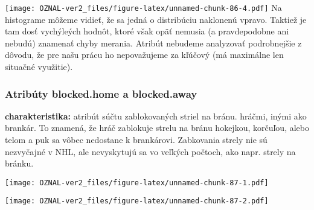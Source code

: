 \documentclass[
]{article}
\newenvironment{Shaded}{\begin{snugshade}}{\end{snugshade}}
\newcommand{\AttributeTok}[1]{\textcolor[rgb]{0.77,0.63,0.00}{#1}}
\newcommand{\FunctionTok}[1]{\textcolor[rgb]{0.00,0.00,0.00}{#1}}
\newcommand{\NormalTok}[1]{#1}
\newcommand{\SpecialCharTok}[1]{\textcolor[rgb]{0.00,0.00,0.00}{#1}}
\newcommand{\StringTok}[1]{\textcolor[rgb]{0.31,0.60,0.02}{#1}}
\begin{document}
\texttt{[image: OZNAL-ver2\_files/figure-latex/unnamed-chunk-86-4.pdf]}
Na histograme môžeme vidieť, že sa jedná o distribúciu naklonenú vpravo.
Taktiež je tam dosť vychýleých hodnôt, ktoré však opäť nemusia (a
pravdepodobne ani nebudú) znamenať chyby merania. Atribút nebudeme
analyzovať podrobnejšie z dôvodu, že pre našu prácu ho nepovažujeme za
kľúčový (má maximálne len situačné využitie).

\hypertarget{atribuxfaty-blocked.home-a-blocked.away}{%
\subsubsection{Atribúty blocked.home a
blocked.away}\label{atribuxfaty-blocked.home-a-blocked.away}}

\textbf{charakteristika:} atribút súčtu zablokovaných striel na bránu.
hráčmi, inými ako brankár. To znamená, že hráč zablokuje strelu na bránu
hokejkou, korčuľou, alebo telom a puk sa vôbec nedostane k brankárovi.
Zabkovania strely nie sú nezvyčajné v NHL, ale nevyskytujú sa vo veľkých
počtoch, ako napr. strely na bránku.

\begin{Shaded}
\end{Shaded}

\texttt{[image: OZNAL-ver2\_files/figure-latex/unnamed-chunk-87-1.pdf]}

\begin{Shaded}
\end{Shaded}

\texttt{[image: OZNAL-ver2\_files/figure-latex/unnamed-chunk-87-2.pdf]}

\begin{Shaded}
\end{Shaded}
\end{document}
